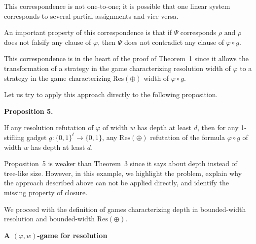 This correspondence is not one-to-one; it is possible that one linear system corresponds to several partial assignments and vice versa.\par



An important property of this correspondence is that if $\Psi$ corresponds $\rho$ and $\rho$ does not falsify any clause of $\varphi$, then $\Psi$ does not contradict any clause of $\varphi\circ g$.\par



This correspondence is in the heart of the proof of Theorem 1 since it allows the transformation of a strategy in the game characterizing resolution width of $\varphi$ to a strategy in the game characterizing $\mathrm{Res}(\oplus)$ width of $\varphi\circ g$.\par



Let us try to apply this approach directly to the following proposition.\par



\par\medskip\noindent\textbf{
Proposition 5.
}\par



If any resolution refutation of $\varphi$ of width $w$ has depth at least $d$, then for any 1-stifling gadget $g\colon\{0,1\}^{\ell}\to\{0,1\}$, any $\mathrm{Res}(\oplus)$ refutation of the formula $\varphi\circ g$ of width $w$ has depth at least $d$.\par




Proposition 5 is weaker than Theorem 3 since it says about depth instead of tree-like size. However, in this example, we highlight the problem, explain why the approach described above can not be applied directly, and identify the missing property of closure.\par



We proceed with the definition of games characterizing depth in bounded-width resolution and bounded-width $\mathrm{Res}(\oplus)$.\par


\par\medskip\noindent\textbf{A $(\varphi,w)$-game for resolution}\par


